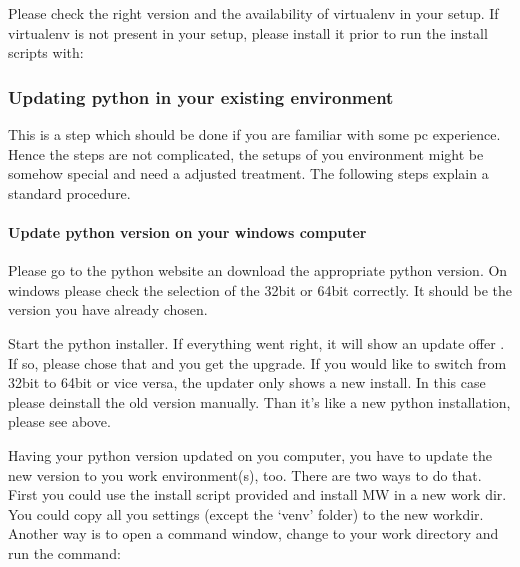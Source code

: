 \documentclass[a4paper,10pt,english]{sphinxmanual}
\begin{document}
\sphinxAtStartPar
Please check the right version and the availability of virtualenv in your setup. If
virtualenv is not present in your setup, please install it prior to run the install
scripts with:

\begin{sphinxVerbatim}[commandchars=\\\{\}]
   
\end{sphinxVerbatim}


\subsubsection{Updating python in your existing environment}
\label{\detokenize{install/python:updating-python-in-your-existing-environment}}
\sphinxAtStartPar
This is a step which should be done if you are familiar with some pc experience.
Hence the steps are not complicated, the setups of you environment might be
somehow special and need a adjusted treatment. The following steps explain a
standard procedure.


\paragraph{Update python version on your windows computer}
\label{\detokenize{install/python:update-python-version-on-your-windows-computer}}
\sphinxAtStartPar
Please go to the python website an download the appropriate python version. On
windows please check the selection of the 32bit or 64bit correctly. It should be
the version you have already chosen.

\sphinxAtStartPar
Start the python installer. If everything went right, it will show an update offer
. If so, please chose that and you get the upgrade. If you would like to switch
from 32bit to 64bit or vice versa, the updater only shows a new install. In this
case please deinstall the old version manually. Than it’s like a new python
installation, please see above.

\sphinxAtStartPar
Having your python version updated on you computer, you have to update the new
version to you work environment(s), too. There are two ways to do that. First you
could use the install script provided and install MW in a new work dir. You could
copy all you settings (except the ‘venv’ folder) to the new workdir. Another way
is to open a command window, change to your work directory and run the command:
\end{document}
